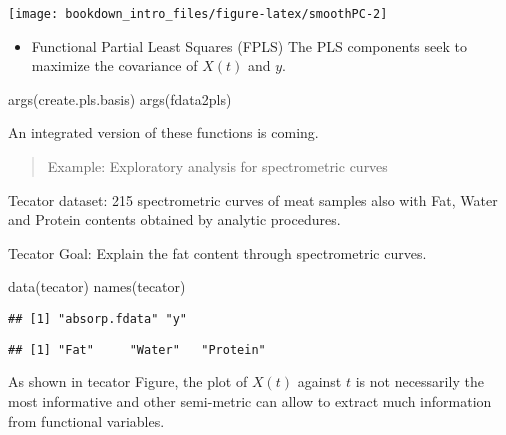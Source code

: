 \documentclass[
]{book}
\newenvironment{Shaded}{\begin{snugshade}}{\end{snugshade}}
\newcommand{\FunctionTok}[1]{\textcolor[rgb]{0.00,0.00,0.00}{#1}}
\newcommand{\NormalTok}[1]{#1}
\newcommand{\SpecialCharTok}[1]{\textcolor[rgb]{0.00,0.00,0.00}{#1}}
\providecommand{\tightlist}{%
  \setlength{\itemsep}{0pt}\setlength{\parskip}{0pt}}
\begin{document}
\begin{center}\texttt{[image: bookdown\_intro\_files/figure-latex/smoothPC-2]} \end{center}

\begin{itemize}
\tightlist
\item
  Functional Partial Least Squares (FPLS) \citep{kramer}
  The PLS components seek to maximize the covariance of \(X(t)\) and \(y\).
\end{itemize}

\begin{Shaded}
\begin{Highlighting}[]
\FunctionTok{args}\NormalTok{(create.pls.basis)}
\FunctionTok{args}\NormalTok{(fdata2pls)}
\end{Highlighting}
\end{Shaded}

An integrated version of these functions is coming.

\begin{quote}
Example: Exploratory analysis for spectrometric curves
\end{quote}

Tecator dataset: 215 spectrometric curves of meat samples also with Fat, Water and Protein contents obtained by analytic procedures.

Tecator Goal: Explain the fat content through spectrometric curves.

\begin{Shaded}
\begin{Highlighting}[]
\FunctionTok{data}\NormalTok{(tecator)}
\FunctionTok{names}\NormalTok{(tecator)}
\end{Highlighting}
\end{Shaded}

\begin{verbatim}
## [1] "absorp.fdata" "y"
\end{verbatim}

\begin{Shaded}
\end{Shaded}

\begin{verbatim}
## [1] "Fat"     "Water"   "Protein"
\end{verbatim}

As shown in tecator Figure, the plot of \(X(t)\) against \(t\) is not necessarily the most informative and other semi-metric can allow to extract much information from functional variables.
\end{document}
